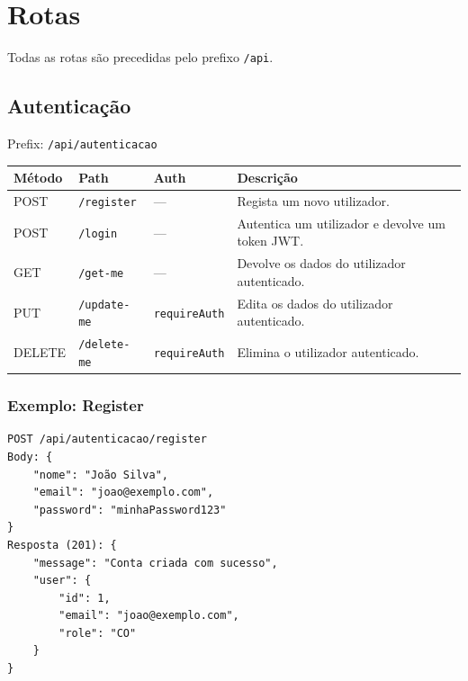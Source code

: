 \documentclass[12pt,a4paper]{article}
\begin{document}
\newpage

\section{Rotas}

Todas as rotas são precedidas pelo prefixo \texttt{/api}.

\subsection{Autenticação}
\label{sec:autenticacao}

Prefix: \texttt{/api/autenticacao}

\begin{longtable}{@{}lllp{6cm}@{}}
    \toprule
    \textbf{Método} & \textbf{Path} & \textbf{Auth} & \textbf{Descrição} \\
    \midrule
    \endhead
    \bottomrule
    \endfoot

    POST & \texttt{/register} & --- & Regista um novo utilizador. \\
    POST & \texttt{/login} & --- & Autentica um utilizador e devolve um token JWT. \\
    GET  & \texttt{/get-me} & --- & Devolve os dados do utilizador autenticado. \\
    PUT  & \texttt{/update-me} & \texttt{requireAuth} & Edita os dados do utilizador autenticado. \\
    DELETE & \texttt{/delete-me} & \texttt{requireAuth} & Elimina o utilizador autenticado. \\
\end{longtable}

\subsubsection*{Exemplo: Register}
\begin{lstlisting}
POST /api/autenticacao/register
Body: {
    "nome": "João Silva",
    "email": "joao@exemplo.com",
    "password": "minhaPassword123"
}
Resposta (201): {
    "message": "Conta criada com sucesso",
    "user": {
        "id": 1,
        "email": "joao@exemplo.com",
        "role": "CO"
    }
}
\end{lstlisting}
\end{document}
